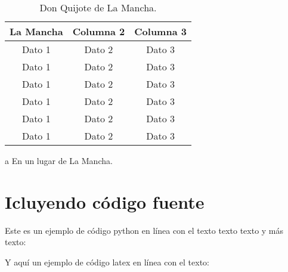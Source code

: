 \begin{table}[!ht]
  \caption{Don Quijote de La Mancha.}
  \centering
  \begin{threeparttable}
  \begin{tabular}{ccc}

  \toprule
  \textbf{La Mancha}\tnote{a} & \textbf{Columna 2} & \textbf{Columna 3}\\
  \midrule
  Dato 1             & Dato 2             & Dato 3\\
  Dato 1             & Dato 2             & Dato 3\\
  Dato 1             & Dato 2             & Dato 3\\
  Dato 1             & Dato 2             & Dato 3\\
  Dato 1             & Dato 2             & Dato 3\\
  Dato 1             & Dato 2             & Dato 3\\
  \bottomrule

  \end{tabular}
  \begin{tablenotes}
    \item[a] En un lugar de La Mancha.
  \end{tablenotes}
  \end{threeparttable}
  \label{tab:donquijote}
\end{table}


\section{Icluyendo código fuente}
Este es un ejemplo de código python en línea con el texto texto texto y más texto:

{\small{}}

Y aquí un ejemplo de código latex en línea con el texto:

{\small{}}
{\small{}}
